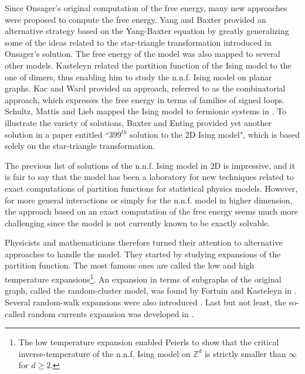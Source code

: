 \documentclass[a4paper,oneside,11pt]{article}
\begin{document}
Since Onsager's original computation of the free energy, many new approaches were proposed to compute the free energy. Yang and Baxter provided an alternative strategy based on the Yang-Baxter equation by greatly generalizing some of the ideas related to the star-triangle transformation introduced in Onsager's solution. The free energy of the model was also mapped to several other models. Kasteleyn \cite{Kas63} related the partition function of the Ising model  to the one of dimers, thus enabling him to study the n.n.f. Ising model on planar graphs. Kac and Ward \cite{KacWar52} provided an approach, referred to as the combinatorial approach, which expresses the free energy in terms of families of signed loops. Schultz, Mattis and Lieb mapped the Ising model to fermionic systems in \cite{SchMatLie64}. To illustrate the variety of solutions, Baxter and Enting \cite{BaxEnt78} provided yet another solution in a paper entitled ``399$^{th}$ solution to the 2D Ising model", which is based solely on the star-triangle transformation. 

The previous list of solutions of the n.n.f. Ising model in 2D is impressive, and it is fair to say that the model has been a laboratory for new techniques related to exact computations of partition functions for statistical physics models. 
However, for more general interactions or simply for the n.n.f. model in higher dimension, the approach based on an exact computation of the free energy seems much more challenging since the model is not currently known to be exactly solvable. 

Physicists and mathematicians therefore turned their attention to alternative approaches to handle the model. They started by studying expansions of the partition function. The most famous ones are called the low and high temperature expansions\footnote{The low temperature expansion enabled Peierls to show that the critical inverse-temperature of the n.n.f. Ising model on $\mathbb Z^d$ is strictly smaller than $\infty$ for $d\ge2$.}. An expansion in terms of subgraphs of the original graph, called the random-cluster model, was found by Fortuin and Kasteleyn in \cite{ForKas72}. %
Several random-walk expansions were also introduced \cite{BryFroSpe82,Sym66}. Last but not least, the so-called random currents expansion was developed in \cite{GriHurShe70,Aiz82}. 
\end{document}
